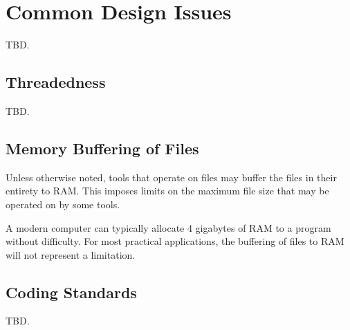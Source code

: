 \chapter{Common Design Issues}
\label{ccdi2}

TBD.


\section{Threadedness}
\label{ccdi2:stdd0}

TBD.


\section{Memory Buffering of Files}
\label{ccdi2:smbf0}

Unless otherwise noted, tools that operate on files may buffer the files in their entirety
to RAM.  This imposes limits on the maximum file size that may be operated on by some tools.

A modern computer can typically allocate 4 gigabytes of RAM to a program without difficulty.
For most practical applications, the buffering of files to RAM will not represent a limitation.



\section{Coding Standards}
\label{ccdi2:scst0}

TBD.


